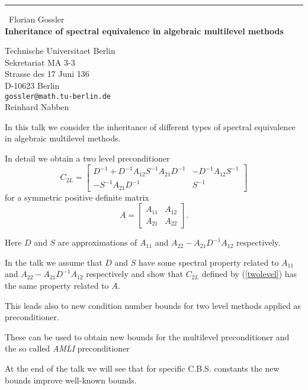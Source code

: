 \documentclass{report}
\begin{document}
\begin{center}
\rule{6in}{1pt} \
{\large Florian Gossler \\
{\bf Inheritance of spectral equivalence in algebraic multilevel methods}}

Technische Universitaet Berlin \\ Sekretariat MA 3-3 \\ Strasse des 17 Juni 136 \\ D-10623 Berlin
\\
{\tt gossler@math.tu-berlin.de}\\
Reinhard Nabben\end{center}

In this talk we consider the inheritance of different types of spectral
equivalence in algebraic multilevel methods.

In detail we obtain a two level preconditioner
\begin{equation}
C_{2L}=\left[\begin{array}{cc}D^{-1}+ D^{-1}A_{12}{S}^{-1}A_{21}D^{-1} &
- D^{-1}A_{12}{S}^{-1}\\
-{S}^{-1}A_{21}D^{-1} & {S}^{-1}\end{array}\right]\label{twolevel}
\end{equation}
for a symmetric positive definite matrix
$$A=\left[\begin{array}{cc}A_{11}&A_{12}\\A_{21}&A_{22}\end{array}\right].$$

Here $D$ and $S$ are approximations of $A_{11}$ and
$A_{22}-A_{21}D^{-1}A_{12}$ respectively.

\bigskip

In the talk we assume that $D$ and $S$ have some spectral property
related to $A_{11}$ and $A_{22}-A_{21}D^{-1}A_{12}$ respectively and show
that $C_{2L}$ defined by (\ref{twolevel}) has the same property related
to $A$.

This leads also to
new condition number bounds for two level methods applied as preconditioner.

\bigskip

These can be used to obtain new bounds for the multilevel preconditioner
and the so called \emph{AMLI} preconditioner

\bigskip

At the end of the talk we will see that for specific C.B.S. constants the
new bounds improve well-known bounds.
\end{document}
